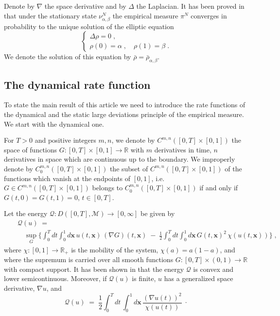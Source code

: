 \documentclass[reqno]{amsart}
\begin{document}
Denote by $\nabla$ the space derivative and by $\Delta$ the Laplacian.
It has been proved in \cite{els1} that under the stationary state
$\nu^N_{\alpha, \beta}$ the empirical measure $\pi^N$ converges in
probability to the unique solution of the elliptic equation
$$
\left\{
\begin{array}{l}
\Delta \rho = 0\;, \\
\rho(0) = \alpha\;, \quad \rho(1) = \beta \;.
\end{array}
\right.
$$
We denote the solution of this equation by $\bar\rho =
\bar\rho_{\alpha, \beta}$.

\subsection*{The dynamical rate function} To state the main result of
this article we need to introduce the rate functions of the dynamical
and the static large deviations principle of the empirical measure. We
start with the dynamical one.

For $T>0$ and positive integers $m,n$, we denote by
$C^{m,n}([0,T]\times[0,1])$ the space of functions $G \colon
[0,T]\times[0,1] \to{{\mathbb R}}$ with $m$ derivatives in time, $n$
derivatives in space which are continuous up to the boundary. We
improperly denote by $C^{m,n}_0([0,T]\times[0,1])$ the subset of
$C^{m,n}([0,T]\times[0,1])$ of the functions which vanish at the
endpoints of $[0,1]$, i.e.\ $G\in C^{m,n}([0,T]\times[0,1])$ belongs
to $C^{m,n}_0([0,T]\times[0,1])$ if and only if $G(t, 0)=G(t, 1)=0$,
$t\in[0,T]$.

Let the energy ${{\mathcal Q}}: D([0,T], {{\mathscr M}}) \to [0,\infty]$ be given by
\begin{eqnarray*}
\!\!\!\!\!\!\!\!\!\!\!\!\! &&
{{\mathcal Q}}(u) \;=\;  \\
\!\!\!\!\!\!\!\!\!\!\!\!\! && \quad
\sup_{G} \Big\{ \int_0^T dt \int_{0}^1 d{{\mathbf x}}\,  u(t,{{\mathbf x}}) \,
(\nabla G)(t,{{\mathbf x}}) \;-\; \frac 12  \int_0^T dt \int_{0}^1 d{{\mathbf x}}\,
G(t,{{\mathbf x}})^2 \, \chi (u(t,{{\mathbf x}})) \Big\}\;, 
\end{eqnarray*}
where $\chi:[0,1]\to{{\mathbb R}}_+$ is the mobility of the system, $\chi(a) =
a(1-a)$, and where the supremum is carried over all smooth functions
$G: [0,T]\times (0,1) \to{{\mathbb R}}$ with compact support.  It has been
shown in \cite{blm1} that the energy ${{\mathcal Q}}$ is convex and lower
semicontinuous. Moreover, if ${{\mathcal Q}}(u)$ is finite, $u$ has a
generalized space derivative, $\nabla u$, and
\begin{equation*}
{{\mathcal Q}}(u) \;=\; \frac 12 \int_0^T dt\, \int_{0}^1 d{{\mathbf x}}\,
\frac{(\nabla u(t))^2}{\chi (u(t))}\;\cdot 
\end{equation*}
\end{document}

